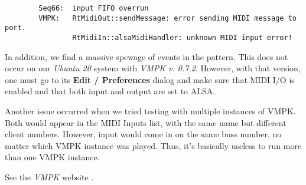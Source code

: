    \begin{verbatim}
        Seq66:  input FIFO overrun
        VMPK:   RtMidiOut::sendMessage: error sending MIDI message to port.
                RtMidiIn::alsaMidiHandler: unknown MIDI input error!
   \end{verbatim}

   In addition, we find a massive spewage of events in the pattern.
   This does not occur on our \textsl{Ubuntu 20} system with
   \textsl{VMPK v. 0.7.2}.
   However, with that version, one must go to its \textbf{Edit / Preferences}
   dialog and make sure that MIDI I/O is enabled and that both input
   and output are set to ALSA.

   Another issue occurred when we tried testing with multiple instances
   of VMPK. Both would appear in the MIDI Inputs list, with the same name but
   different client numbers.  However, input would come in on the same buss
   number, no matter which VMPK instance was played.
   Thus, it's basically useless to run more than one VMPK instance.

   See the \textsl{VMPK} website \cite{vmpk}.


